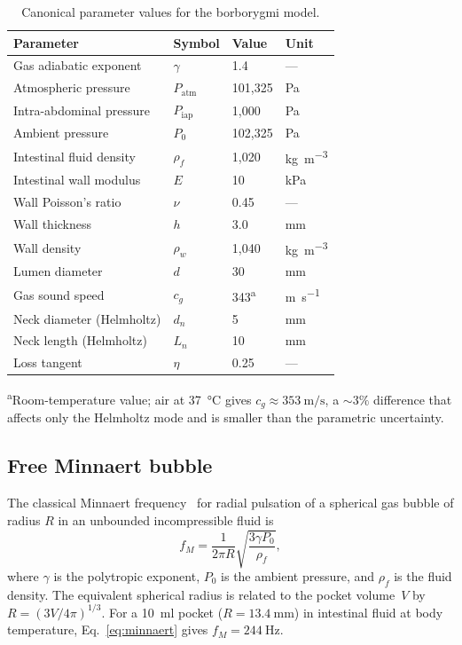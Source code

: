 \documentclass[12pt]{article}
\begin{document}
\begin{table}[t]
\centering
\caption{Canonical parameter values for the borborygmi model.}
\label{tab:params}
\begin{tabular}{llll}
\toprule
Parameter & Symbol & Value & Unit \\
\midrule
Gas adiabatic exponent & $\gamma$ & 1.4 & --- \\
Atmospheric pressure & $P_\mathrm{atm}$ & 101,325 & \si{\pascal} \\
Intra-abdominal pressure & $P_\mathrm{iap}$ & 1,000 & \si{\pascal} \\
Ambient pressure & $P_0$ & 102,325 & \si{\pascal} \\
Intestinal fluid density & $\rho_f$ & 1,020 & \si{\kilogram\per\metre\cubed} \\
Intestinal wall modulus & $E$ & 10 & \si{\kilo\pascal} \\
Wall Poisson's ratio & $\nu$ & 0.45 & --- \\
Wall thickness & $h$ & 3.0 & \si{\milli\metre} \\
Wall density & $\rho_w$ & 1,040 & \si{\kilogram\per\metre\cubed} \\
Lumen diameter & $d$ & 30 & \si{\milli\metre} \\
Gas sound speed & $c_g$ & 343\textsuperscript{a} & \si{\metre\per\second} \\
Neck diameter (Helmholtz) & $d_n$ & 5 & \si{\milli\metre} \\
Neck length (Helmholtz) & $L_n$ & 10 & \si{\milli\metre} \\
Loss tangent & $\eta$ & 0.25 & --- \\
\bottomrule
\end{tabular}
\par\smallskip
\textsuperscript{a}Room-temperature value; air at \SI{37}{\degreeCelsius} gives
$c_g \approx \SI{353}{\metre\per\second}$, a ${\sim}3\%$ difference that
affects only the Helmholtz mode and is smaller than the parametric uncertainty.
\end{table}

\subsection{Free Minnaert bubble}
\label{sec:minnaert}

The classical Minnaert frequency~\cite{Minnaert1933} for radial pulsation of
a spherical gas bubble of radius $R$ in an unbounded incompressible fluid is
\begin{equation}
  f_M = \frac{1}{2\pi R}\sqrt{\frac{3\gamma P_0}{\rho_f}},
  \label{eq:minnaert}
\end{equation}
where $\gamma$ is the polytropic exponent, $P_0$ is the ambient pressure, and
$\rho_f$ is the fluid density.  The equivalent spherical radius is related to
the pocket volume~$V$ by $R = (3V/4\pi)^{1/3}$.  For a
\SI{10}{\milli\litre} pocket ($R = \SI{13.4}{\milli\metre}$) in intestinal
fluid at body temperature, Eq.~\eqref{eq:minnaert} gives
$f_M = \SI{244}{\hertz}$.
\end{document}
